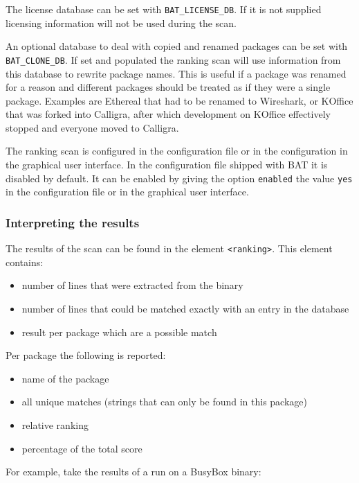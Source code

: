 \documentclass[10pt]{article}
\begin{document}
The license database can be set with \texttt{BAT\_LICENSE\_DB}. If it is not
supplied licensing information will not be used during the scan.

An optional database to deal with copied and renamed packages can be set with
\texttt{BAT\_CLONE\_DB}. If set and populated the ranking scan will use
information from this database to rewrite package names. This is useful if a
package was renamed for a reason and different packages should be treated as if
they were a single package. Examples are Ethereal that had to be renamed to
Wireshark, or KOffice that was forked into Calligra, after which development
on KOffice effectively stopped and everyone moved to Calligra.

The ranking scan is configured in the configuration file or in the
configuration in the graphical user interface. In the configuration file
shipped with BAT it is disabled by default. It can be enabled by giving the
option \texttt{enabled} the value \texttt{yes} in the configuration file or
in the graphical user interface.

\subsubsection{Interpreting the results}

The results of the scan can be found in the element \texttt{<ranking>}. This
element contains:

\begin{itemize}
\item number of lines that were extracted from the binary
\item number of lines that could be matched exactly with an entry in the
database
\item result per package which are a possible match
\end{itemize}

Per package the following is reported:

\begin{itemize}
\item name of the package
\item all unique matches (strings that can only be found in this package)
\item relative ranking
\item percentage of the total score
\end{itemize}

For example, take the results of a run on a BusyBox binary:
\end{document}
